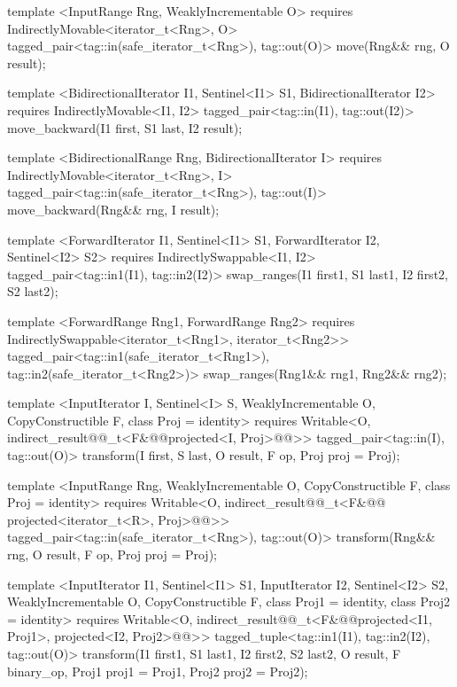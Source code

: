 {\begin{codeblock}
{{    template <InputRange Rng, WeaklyIncrementable O>
      requires IndirectlyMovable<iterator_t<Rng>, O>
      tagged_pair<tag::in(safe_iterator_t<Rng>), tag::out(O)>
        move(Rng&& rng, O result);

    template <BidirectionalIterator I1, Sentinel<I1> S1, BidirectionalIterator I2>
      requires IndirectlyMovable<I1, I2>
      tagged_pair<tag::in(I1), tag::out(I2)>
        move_backward(I1 first, S1 last, I2 result);

    template <BidirectionalRange Rng, BidirectionalIterator I>
      requires IndirectlyMovable<iterator_t<Rng>, I>
      tagged_pair<tag::in(safe_iterator_t<Rng>), tag::out(I)>
        move_backward(Rng&& rng, I result);

    template <ForwardIterator I1, Sentinel<I1> S1, ForwardIterator I2, Sentinel<I2> S2>
      requires IndirectlySwappable<I1, I2>
      tagged_pair<tag::in1(I1), tag::in2(I2)>
        swap_ranges(I1 first1, S1 last1, I2 first2, S2 last2);

    template <ForwardRange Rng1, ForwardRange Rng2>
      requires IndirectlySwappable<iterator_t<Rng1>, iterator_t<Rng2>>
      tagged_pair<tag::in1(safe_iterator_t<Rng1>), tag::in2(safe_iterator_t<Rng2>)>
        swap_ranges(Rng1&& rng1, Rng2&& rng2);

    template <InputIterator I, Sentinel<I> S, WeaklyIncrementable O,
        CopyConstructible F, class Proj = identity>
      requires Writable<O, indirect_result@@_t<F&@\oldtxt{(}\newtxt{, }@projected<I, Proj>@\oldtxt{)}@>>
      tagged_pair<tag::in(I), tag::out(O)>
        transform(I first, S last, O result, F op, Proj proj = Proj{});

    template <InputRange Rng, WeaklyIncrementable O, CopyConstructible F,
        class Proj = identity>
      requires Writable<O, indirect_result@@_t<F&@\oldtxt{(}\newtxt{,}@
        projected<iterator_t<R>, Proj>@\oldtxt{)}@>>
      tagged_pair<tag::in(safe_iterator_t<Rng>), tag::out(O)>
        transform(Rng&& rng, O result, F op, Proj proj = Proj{});

    template <InputIterator I1, Sentinel<I1> S1, InputIterator I2, Sentinel<I2> S2,
        WeaklyIncrementable O, CopyConstructible F, class Proj1 = identity,
        class Proj2 = identity>
      requires Writable<O, indirect_result@@_t<F&@\oldtxt{(}\newtxt{, }@projected<I1, Proj1>,
        projected<I2, Proj2>@\oldtxt{)}@>>
      tagged_tuple<tag::in1(I1), tag::in2(I2), tag::out(O)>
        transform(I1 first1, S1 last1, I2 first2, S2 last2, O result,
                F binary_op, Proj1 proj1 = Proj1{}, Proj2 proj2 = Proj2{});

}}
\end{codeblock}}
